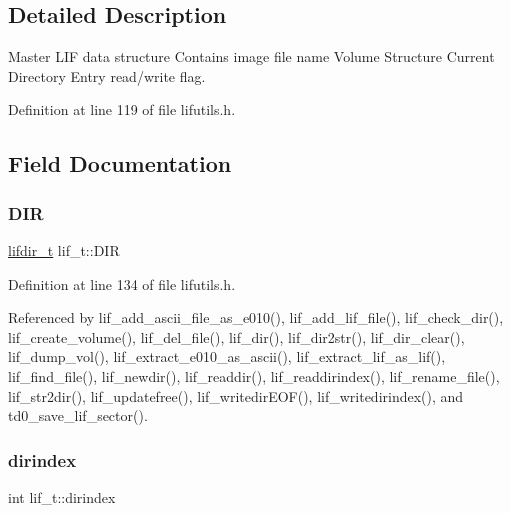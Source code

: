 \subsection{Detailed Description}
Master L\+IF data structure Contains image file name Volume Structure Current Directory Entry read/write flag. 

Definition at line 119 of file lifutils.\+h.



\subsection{Field Documentation}
\mbox{\label{structlif__t_aefeaa526c04a2b8715b0392feeec52a3}} 
\subsubsection{\texorpdfstring{D\+IR}{DIR}}
{\footnotesize\ttfamily \hyperlink{structlifdir__t}{lifdir\+\_\+t} lif\+\_\+t\+::\+D\+IR}



Definition at line 134 of file lifutils.\+h.



Referenced by lif\+\_\+add\+\_\+ascii\+\_\+file\+\_\+as\+\_\+e010(), lif\+\_\+add\+\_\+lif\+\_\+file(), lif\+\_\+check\+\_\+dir(), lif\+\_\+create\+\_\+volume(), lif\+\_\+del\+\_\+file(), lif\+\_\+dir(), lif\+\_\+dir2str(), lif\+\_\+dir\+\_\+clear(), lif\+\_\+dump\+\_\+vol(), lif\+\_\+extract\+\_\+e010\+\_\+as\+\_\+ascii(), lif\+\_\+extract\+\_\+lif\+\_\+as\+\_\+lif(), lif\+\_\+find\+\_\+file(), lif\+\_\+newdir(), lif\+\_\+readdir(), lif\+\_\+readdirindex(), lif\+\_\+rename\+\_\+file(), lif\+\_\+str2dir(), lif\+\_\+updatefree(), lif\+\_\+writedir\+E\+O\+F(), lif\+\_\+writedirindex(), and td0\+\_\+save\+\_\+lif\+\_\+sector().

\mbox{\label{structlif__t_a74f8af3dc203c3c6b9dea3829bb4b6fa}} 
\subsubsection{\texorpdfstring{dirindex}{dirindex}}
{\footnotesize\ttfamily int lif\+\_\+t\+::dirindex}



